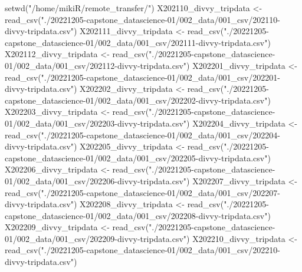 \documentclass[
]{article}
\newenvironment{Shaded}{\begin{snugshade}}{\end{snugshade}}
\newcommand{\FunctionTok}[1]{\textcolor[rgb]{0.00,0.00,0.00}{#1}}
\newcommand{\NormalTok}[1]{#1}
\newcommand{\OtherTok}[1]{\textcolor[rgb]{0.56,0.35,0.01}{#1}}
\newcommand{\StringTok}[1]{\textcolor[rgb]{0.31,0.60,0.02}{#1}}
\begin{document}
\begin{Shaded}
\begin{Highlighting}[]
\FunctionTok{setwd}\NormalTok{(}\StringTok{"/home/mikiR/remote\_transfer/"}\NormalTok{)}
\NormalTok{X202110\_divvy\_tripdata }\OtherTok{\textless{}{-}} 
  \FunctionTok{read\_csv}\NormalTok{(}\StringTok{"./20221205{-}capstone\_datascience{-}01/002\_data/001\_csv/202110{-}divvy{-}tripdata.csv"}\NormalTok{)}
\NormalTok{X202111\_divvy\_tripdata }\OtherTok{\textless{}{-}} 
  \FunctionTok{read\_csv}\NormalTok{(}\StringTok{"./20221205{-}capstone\_datascience{-}01/002\_data/001\_csv/202111{-}divvy{-}tripdata.csv"}\NormalTok{)}
\NormalTok{X202112\_divvy\_tripdata }\OtherTok{\textless{}{-}} 
  \FunctionTok{read\_csv}\NormalTok{(}\StringTok{"./20221205{-}capstone\_datascience{-}01/002\_data/001\_csv/202112{-}divvy{-}tripdata.csv"}\NormalTok{)}
\NormalTok{X202201\_divvy\_tripdata }\OtherTok{\textless{}{-}} 
  \FunctionTok{read\_csv}\NormalTok{(}\StringTok{"./20221205{-}capstone\_datascience{-}01/002\_data/001\_csv/202201{-}divvy{-}tripdata.csv"}\NormalTok{)}
\NormalTok{X202202\_divvy\_tripdata }\OtherTok{\textless{}{-}} 
  \FunctionTok{read\_csv}\NormalTok{(}\StringTok{"./20221205{-}capstone\_datascience{-}01/002\_data/001\_csv/202202{-}divvy{-}tripdata.csv"}\NormalTok{)}
\NormalTok{X202203\_divvy\_tripdata }\OtherTok{\textless{}{-}} 
  \FunctionTok{read\_csv}\NormalTok{(}\StringTok{"./20221205{-}capstone\_datascience{-}01/002\_data/001\_csv/202203{-}divvy{-}tripdata.csv"}\NormalTok{)}
\NormalTok{X202204\_divvy\_tripdata }\OtherTok{\textless{}{-}} 
  \FunctionTok{read\_csv}\NormalTok{(}\StringTok{"./20221205{-}capstone\_datascience{-}01/002\_data/001\_csv/202204{-}divvy{-}tripdata.csv"}\NormalTok{)}
\NormalTok{X202205\_divvy\_tripdata }\OtherTok{\textless{}{-}} 
  \FunctionTok{read\_csv}\NormalTok{(}\StringTok{"./20221205{-}capstone\_datascience{-}01/002\_data/001\_csv/202205{-}divvy{-}tripdata.csv"}\NormalTok{)}
\NormalTok{X202206\_divvy\_tripdata }\OtherTok{\textless{}{-}} 
  \FunctionTok{read\_csv}\NormalTok{(}\StringTok{"./20221205{-}capstone\_datascience{-}01/002\_data/001\_csv/202206{-}divvy{-}tripdata.csv"}\NormalTok{)}
\NormalTok{X202207\_divvy\_tripdata }\OtherTok{\textless{}{-}} 
  \FunctionTok{read\_csv}\NormalTok{(}\StringTok{"./20221205{-}capstone\_datascience{-}01/002\_data/001\_csv/202207{-}divvy{-}tripdata.csv"}\NormalTok{)}
\NormalTok{X202208\_divvy\_tripdata }\OtherTok{\textless{}{-}} 
  \FunctionTok{read\_csv}\NormalTok{(}\StringTok{"./20221205{-}capstone\_datascience{-}01/002\_data/001\_csv/202208{-}divvy{-}tripdata.csv"}\NormalTok{)}
\NormalTok{X202209\_divvy\_tripdata }\OtherTok{\textless{}{-}} 
  \FunctionTok{read\_csv}\NormalTok{(}\StringTok{"./20221205{-}capstone\_datascience{-}01/002\_data/001\_csv/202209{-}divvy{-}tripdata.csv"}\NormalTok{)}
\NormalTok{X202210\_divvy\_tripdata }\OtherTok{\textless{}{-}} 
  \FunctionTok{read\_csv}\NormalTok{(}\StringTok{"./20221205{-}capstone\_datascience{-}01/002\_data/001\_csv/202210{-}divvy{-}tripdata.csv"}\NormalTok{)}


\end{Highlighting}
\end{Shaded}
\end{document}
